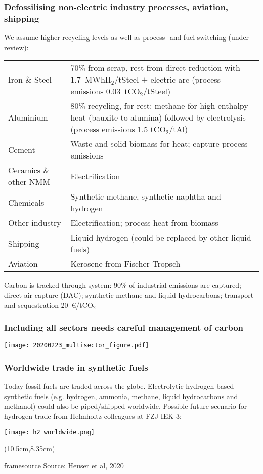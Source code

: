 \documentclass[10pt,aspectratio=169,dvipsnames]{beamer}
\newcommand{\source}[1]{\begin{textblock*}{5cm}(10.5cm,8.35cm)
    \begin{beamercolorbox}[ht=0.5cm,right]{framesource}
        \usebeamerfont{framesource}\usebeamercolor[fg]{framesource} Source: {#1}
    \end{beamercolorbox}
\end{textblock*}}
\begin{document}
\begin{frame}
  \frametitle{Defossilising non-electric industry processes, aviation, shipping}

  We assume higher recycling levels as well as process- and fuel-switching (under review):
    \begin{table}
\centering
\begin{tabular}{@{}lp{10cm}@{}}
  \toprule
  Iron \& Steel & 70\% from scrap, rest from direct reduction with 1.7~MWhH$_2$/tSteel $+$ electric arc (process emissions 0.03~tCO$_2$/tSteel)\\
  Aluminium & 80\% recycling, for rest: methane for high-enthalpy heat (bauxite to alumina) followed by electrolysis (process emissions 1.5 tCO$_2$/tAl) \\
  Cement &  Waste and solid biomass for heat; capture process emissions \\
  Ceramics \& other NMM &  Electrification\\
  Chemicals & Synthetic methane, synthetic naphtha and hydrogen \\
  Other industry & Electrification; process heat from biomass\\
  Shipping & Liquid hydrogen  (could be replaced by other liquid fuels) \\
  Aviation & Kerosene from Fischer-Tropsch  \\
  \bottomrule
\end{tabular}
\end{table}

 Carbon is tracked through system: 90\% of industrial emissions are captured; direct air capture (DAC); synthetic methane and liquid hydrocarbons; transport and sequestration 20~\euro/tCO$_2$

\end{frame}


\begin{frame}
  \frametitle{Including all sectors needs careful management of carbon}

  \centering
  \texttt{[image: 20200223\_multisector\_figure.pdf]}

\end{frame}

\begin{frame}
  \frametitle{Worldwide trade in synthetic fuels}

  Today fossil fuels are traded across the globe. Electrolytic-hydrogen-based synthetic fuels (e.g. hydrogen, ammonia, methane, liquid hydrocarbons and methanol) could also be piped/shipped worldwide.  Possible future scenario for hydrogen trade from Helmholtz colleagues at FZJ IEK-3:

  \centering
  \texttt{[image: h2\_worldwide.png]}


\source{\href{https://www.preprints.org/manuscript/202002.0100/v1}{Heuser et al, 2020}}
\end{frame}
\end{document}
